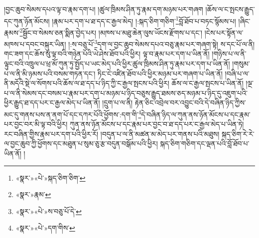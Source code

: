 །བྱང་ཆུབ་སེམས་དཔའ་ལྟ་བ་རྣམ་དག་པ། །ཚུལ་ཁྲིམས་ཤིན་ཏུ་རྣམ་དག་མཉམ་པར་གཞག །ཆོས་ལ་ང་སྤངས་རྒྱུད་དང་ཀུན་ཉོན་མོངས། །རྣམ་པར་དག་པ་ཐ་དད་ང་རྒྱལ་མེད། །:སྐད་ཅིག་གཅིག་\footnote{«སྣར་»«པེ་»སྐད་ཅིག་ཅིག་}བློ་ཐོབ་པ་བཏང་སྙོམས་པ། །ཞིང་རྣམས་\footnote{«སྣར་»རྣམ་}སྦྱོང་བ་སེམས་ཅན་སྨིན་བྱེད་པར། །མཁས་པ་མཐུ་ཆེན་ལུས་ཡོངས་རྫོགས་པ་དང་། །ངེས་པར་སྟོན་ལ་མཁས་པ་དབང་བསྐུར་ཡིན། །:ས་བཅུ་པོ་\footnote{«སྣར་»«པེ་»ས་བཅུ་པོ་དེ་}དག་ལ་བྱང་ཆུབ་སེམས་དཔའ་བཅུ་རྣམ་པར་གཞག་སྟེ། ས་དང་པོ་ལ་ནི། གང་ཟག་དང་ཆོས་སུ་ལྟ་བའི་གཉེན་པོའི་ཡེ་ཤེས་ཐོབ་པའི་ཕྱིར། ལྟ་བ་རྣམ་པར་དག་པ་ཡིན་ནོ། །གཉིས་པ་ལ་ནི་ལྟུང་བའི་འཁྲུལ་པ་ཕྲ་མོ་ཀུན་ཏུ་སྤྱོད་པ་ཡང་མེད་པའི་ཕྱིར་ཚུལ་ཁྲིམས་ཤིན་ཏུ་རྣམ་པར་དག་པ་ཡིན་ནོ། །གསུམ་པ་ལ་ནི་མི་ཉམས་པའི་བསམ་གཏན་དང་། ཏིང་ངེ་འཛིན་ཐོབ་པའི་ཕྱིར་མཉམ་པར་གཞག་པ་ཡིན་ནོ། །བཞི་པ་ལ་ནི་མདོའི་སྡེ་ལ་སོགས་པའི་ཆོས་ལ་ཐ་དད་པ་ཉིད་ཀྱི་ང་རྒྱལ་སྤངས་པའི་ཕྱིར། ཆོས་ལ་ང་རྒྱལ་སྤངས་པ་ཡིན་ནོ། །ལྔ་པ་ལ་ནི་སེམས་དང་བསམ་པ་རྣམ་པར་དག་པ་མཉམ་པ་ཉིད་བཅུས་རྒྱུད་ཐམས་ཅད་མཉམ་པ་ཉིད་དུ་འཇུག་པའི་ཕྱིར་རྒྱུད་ཐ་དད་པར་ང་རྒྱལ་མེད་པ་ཡིན་ནོ། །དྲུག་པ་ལ་ནི། རྟེན་ཅིང་འབྲེལ་བར་འབྱུང་བའི་དེ་བཞིན་ཉིད་ཀྱིས་མང་དུ་གནས་པས་ན་ནག་པོ་དང་དཀར་པོའི་ཕྱོགས་:དག་གི་\footnote{«སྣར་»«པེ་»དག་གིས་}དེ་བཞིན་ཉིད་ལ་ཀུན་ནས་ཉོན་མོངས་པ་དང་རྣམ་པར་བྱང་བར་མི་ལྟ་བའི་ཕྱིར། ཀུན་ནས་ཉོན་མོངས་པ་དང་རྣམ་པར་བྱང་བ་ཐ་དད་པར་ང་རྒྱལ་མེད་པ་ཡིན་ཏེ། རང་བཞིན་གྱིས་རྣམ་པར་དག་པའི་ཕྱིར་རོ། །བདུན་པ་ལ་ནི་མཚན་མ་མེད་པར་གནས་པའི་མཐུས། སྐད་ཅིག་རེ་རེ་ལ་བྱང་ཆུབ་ཀྱི་ཕྱོགས་དང་མཐུན་པ་སུམ་ཅུ་རྩ་བདུན་བསྒོམ་པའི་ཕྱིར། སྐད་ཅིག་གཅིག་དང་ལྡན་པའི་བློ་ཐོབ་པ་ཡིན་ནོ། །
